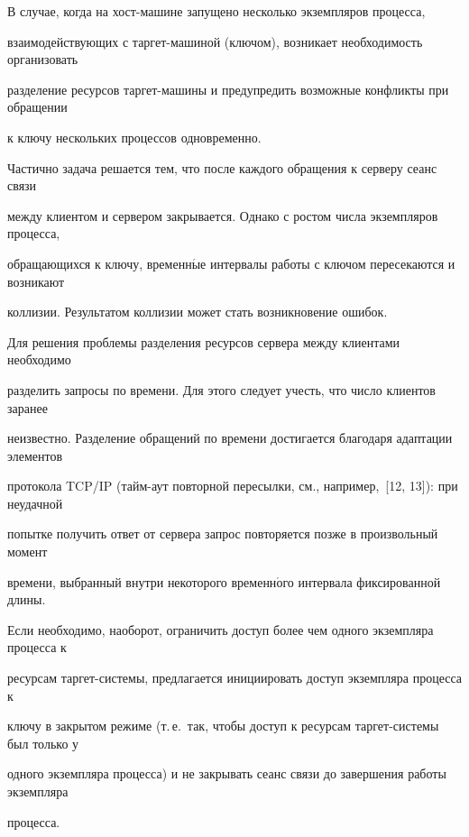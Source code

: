     В случае, когда на хост-машине запущено несколько экземпляров процесса, 


взаимодействующих с таргет-машиной (ключом), возникает необходимость организовать 


разделение ресурсов таргет-машины и предупредить возможные конфликты при обращении 


к ключу нескольких процессов одновременно. 


    


    Частично задача решается тем, что после каждого обращения к серверу сеанс связи 


между клиентом и сервером закрывается. Однако с ростом числа экземпляров процесса, 


обращающихся к ключу, временн$\acute{\mbox{ы}}$е интервалы работы с ключом пересекаются и возникают 


коллизии. Результатом коллизии может стать возникновение ошибок.


    


    Для решения проблемы разделения ресурсов сервера между клиентами необходимо 


разделить запросы по времени. Для этого следует учесть, что число клиентов заранее 


неизвестно. Разделение обращений по времени достигается благодаря адаптации элементов 


протокола TCP/IP (тайм-аут повторной пересылки, см., например,~[12, 13]): при неудачной 


попытке получить ответ от сервера запрос повторяется позже в произвольный момент 


времени, выбранный внутри некоторого временн$\acute{\mbox{о}}$го интервала фиксированной длины.


    


    Если необходимо, наоборот, ограничить доступ более чем одного экземпляра процесса к 


ресурсам тар\-гет-сис\-те\-мы, предлагается инициировать доступ экземпляра процесса к 


ключу в закрытом режиме (т.\,е.\ так, чтобы доступ к ресурсам тар\-гет-сис\-те\-мы был только у 


одного экземпляра процесса) и не закрывать сеанс связи до завершения работы экземпляра 


процесса.








